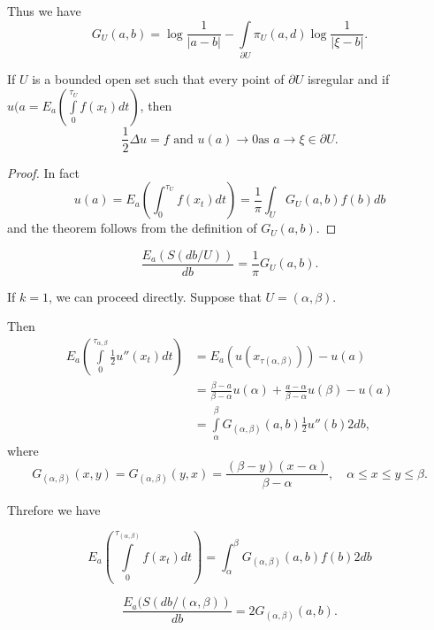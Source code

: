 Thus we have
$$
G_U (a, b) = \log \frac{1}{|a - b|} - \int\limits_{\partial U} \pi_U
(a, d) \log \frac{1}{|\xi - b|}. 
$$

\setcounter{thm}{0}
\begin{thm}\label{chap3-sec5-addthm1}%
  If $U$ is a bounded open set such that every point of $\partial U$
  is\pageoriginale regular and if $u (a = E_a (\int\limits^{\tau_U}_0
  f (x_t) dt)$, then  
  $$
  \frac{1}{2} \Delta u = f \text{ \ and \ } u (a) \rightarrow 0 \text{
  \  as \ } a \rightarrow \xi \in \partial U.  
  $$
\end{thm}

\begin{proof}
In fact
$$
u (a) = E_a \left(\int^{\tau_U}_0 f (x_t)dt\right) = \frac{1}{\pi} \int_{U} G_U
  (a, b) f (b) db 
$$
and the theorem follows from the definition of $G_U(a, b)$.
\end{proof}

\begin{thm}\label{chap3-sec5-addthm2}%
$$
\frac{E_a (S(db/U))}{db} = \frac{1}{\pi} G_U (a, b).
$$
\end{thm}

If $k =1$, we can proceed directly. Suppose that $U = (\alpha , \beta)$.

Then
\begin{align*}
E_a \left(\int\limits^{\tau_{\alpha, \beta}}_0 \frac{1}{2}u'' (x_t)dt\right) & =
  E_a(u(x_{\tau(\alpha , \beta)})) - u(a)\\ 
  & = \frac{\beta - a}{\beta - \alpha} u (\alpha) + \frac{a - \alpha}
  {\beta - \alpha} u (\beta )- u(a)\\ 
  & = \int\limits^\beta_\alpha G_{(\alpha , \beta)} (a, b) \frac{1}{2}
  u'' (b) 2 db, 
\end{align*}
where 
$$
G_{(\alpha , \beta)} (x, y) = G_{(\alpha , \beta)}(y, x) =
\frac{(\beta - y) (x - \alpha)}{\beta - \alpha},\quad \alpha \leq x \leq y
\leq \beta. 
$$

Threfore we have

\begin{thm}\label{chap3-sec5-addthm3} %
$$
E_a \left(\int\limits^{\tau_{(\alpha , \beta)}}_0 f (x_t) dt\right) = \int^\beta_\alpha
  G_{(\alpha , \beta)} (a, b) f (b) 2db 
  $$
\end{thm}

\begin{thm}\label{chap3-sec5-addthm4} %
$$
\frac{E_a (S(db / (\alpha, \beta))}{db} = 2 G_{(\alpha, \beta)}(a, b).
$$
\end{thm}

